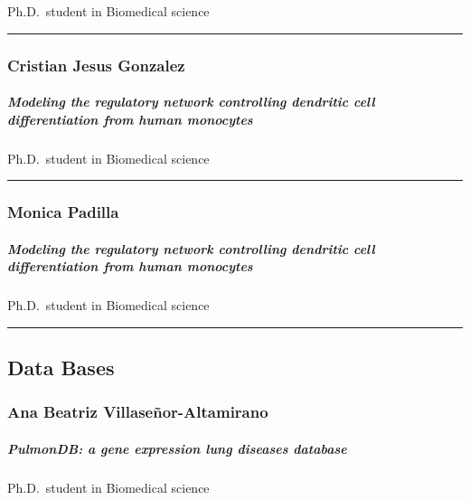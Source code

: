 \documentclass[]{article}
\let\oldsubparagraph\subparagraph
\renewcommand{\subparagraph}[1]{\oldsubparagraph{#1}\mbox{}}
\begin{document}
Ph.D.~student in Biomedical science

\begin{center}\rule{0.5\linewidth}{\linethickness}\end{center}

\subsubsection{Cristian Jesus Gonzalez}\label{cristian-jesus-gonzalez}

\subparagraph{ Modeling the regulatory network controlling dendritic
cell differentiation from human
monocytes}\label{modeling-the-regulatory-network-controlling-dendritic-cell-differentiation-from-human-monocytes-4}

Ph.D.~student in Biomedical science

\begin{center}\rule{0.5\linewidth}{\linethickness}\end{center}

\subsubsection{Monica Padilla}\label{monica-padilla}

\subparagraph{ Modeling the regulatory network controlling dendritic
cell differentiation from human
monocytes}\label{modeling-the-regulatory-network-controlling-dendritic-cell-differentiation-from-human-monocytes-5}

Ph.D.~student in Biomedical science

\begin{center}\rule{0.5\linewidth}{\linethickness}\end{center}

\subsection{Data Bases}\label{data-bases}

\subsubsection{Ana Beatriz
Villaseñor-Altamirano}\label{ana-beatriz-villasenor-altamirano}

\subparagraph{ PulmonDB: a gene expression lung diseases
database}\label{pulmondb-a-gene-expression-lung-diseases-database}

Ph.D.~student in Biomedical science
\end{document}
